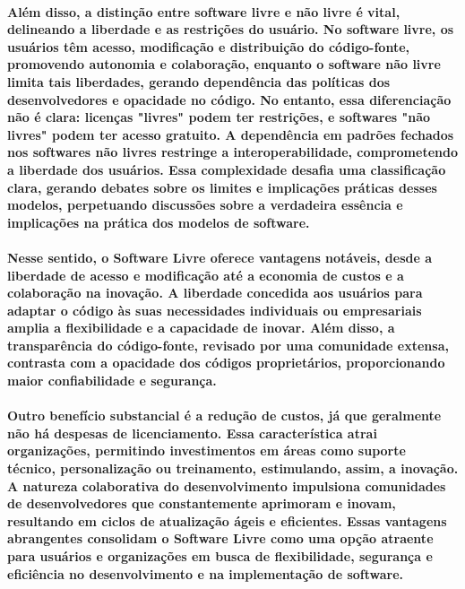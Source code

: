 \documentclass[a4paper, 12pt]{article}
\begin{document}
\paragraph{Além disso, a distinção entre software livre e não livre\cite{dado3} é vital, delineando a liberdade e as restrições do usuário. No software livre\cite{dado4}, os usuários têm acesso, modificação e distribuição do código-fonte, promovendo autonomia e colaboração, enquanto o software não livre limita tais liberdades, gerando dependência das políticas dos desenvolvedores e opacidade no código. No entanto, essa diferenciação não é clara: licenças "livres" podem ter restrições, e softwares "não livres" podem ter acesso gratuito. A dependência em padrões fechados nos softwares não livres restringe a interoperabilidade, comprometendo a liberdade dos usuários. Essa complexidade desafia uma classificação clara, gerando debates sobre os limites e implicações práticas desses modelos, perpetuando discussões sobre a verdadeira essência e implicações na prática dos modelos de software.}

\paragraph{Nesse sentido, o Software Livre oferece vantagens\cite{dado1} notáveis, desde a liberdade de acesso e modificação até a economia de custos e a colaboração na inovação. A liberdade concedida aos usuários para adaptar o código às suas necessidades individuais ou empresariais amplia a flexibilidade e a capacidade de inovar. Além disso, a transparência do código-fonte, revisado por uma comunidade extensa, contrasta com a opacidade dos códigos proprietários, proporcionando maior confiabilidade e segurança.}
\paragraph{Outro benefício substancial é a redução de custos\cite{dado3}, já que geralmente não há despesas de licenciamento. Essa característica atrai organizações, permitindo investimentos em áreas como suporte técnico, personalização ou treinamento, estimulando, assim, a inovação. A natureza colaborativa do desenvolvimento impulsiona comunidades de desenvolvedores que constantemente aprimoram e inovam, resultando em ciclos de atualização ágeis e eficientes. Essas vantagens abrangentes consolidam o Software Livre como uma opção atraente para usuários e organizações em busca de flexibilidade, segurança e eficiência no desenvolvimento e na implementação de software.}
\end{document}
